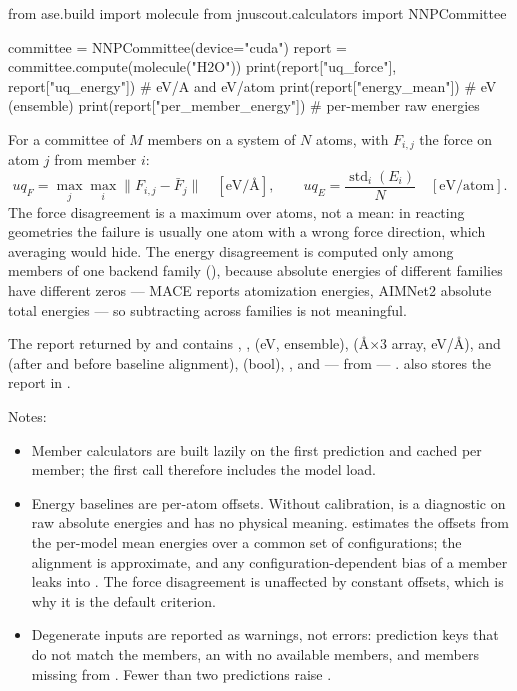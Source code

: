\begin{codeblock}
from ase.build import molecule
from jnuscout.calculators import NNPCommittee

committee = NNPCommittee(device="cuda")
report = committee.compute(molecule("H2O"))
print(report["uq_force"], report["uq_energy"])   # eV/A and eV/atom
print(report["energy_mean"])                     # eV (ensemble)
print(report["per_member_energy"])               # per-member raw energies
\end{codeblock}

\begin{readbox}
For a committee of $M$ members on a system of $N$ atoms, with $F_{i,j}$ the
force on atom $j$ from member $i$:
\[
uq_F = \max_{j} \max_{i} \lVert F_{i,j} - \bar{F}_{j} \rVert
\quad[\text{eV/\AA}],
\qquad
uq_E = \frac{\operatorname{std}_i(E_i)}{N}
\quad[\text{eV/atom}].
\]
The force disagreement is a maximum over atoms, not a mean: in reacting
geometries the failure is usually one atom with a wrong force direction,
which averaging would hide.  The energy disagreement is computed only among
members of one backend family (), because absolute
energies of different families have different zeros --- MACE reports
atomization energies, AIMNet2 absolute total energies --- so subtracting
across families is not meaningful.
\end{readbox}

The report returned by  and  contains
, ,  (eV, ensemble),
 (\AA$\times$3 array, eV/\AA),  and
 (after and before baseline alignment),
 (bool), , and --- from
 --- .   also
stores the report in .

Notes:
\begin{itemize}
  \item Member calculators are built lazily on the first prediction and
  cached per member; the first call therefore includes the model load.
  \item Energy baselines are per-atom offsets.  Without calibration,
   is a diagnostic on raw absolute energies and has no
  physical meaning.  \allowbreak{} estimates the
  offsets from the per-model mean energies over a common set of
  configurations; the alignment is approximate, and any configuration-dependent
  bias of a member leaks into .  The force disagreement is
  unaffected by constant offsets, which is why it is the default criterion.
  \item Degenerate inputs are reported as  warnings, not
  errors: prediction keys that do not match the members, an
   with no available members, and members missing from
  .  Fewer than two predictions raise
  .
\end{itemize}


